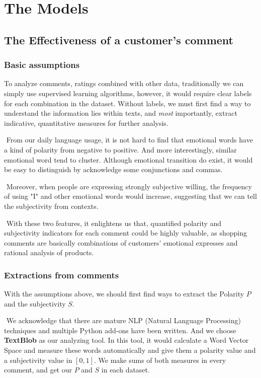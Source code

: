 \documentclass[12pt]{article}  %
\begin{document}
\section{The Models}

\subsection{The Effectiveness of a customer's comment}

\subsubsection{Basic assumptions}

To analyze comments, ratings combined with other data, traditionally we can simply use supervised learning algorithms, however, it would require clear labels for each combination in the dataset. Without labels, we must first find a way to understand the information lies within texts, and \emph{most} importantly, extract indicative, quantitative measures for further analysis.

​		From our daily language usage, it is not hard to find that emotional words have a kind of polarity from negative to positive. And more interestingly, similar emotional word tend to cluster. Although emotional transition do exist, it would be easy to distinguish by acknowledge some conjunctions and commas.

​		Moreover, when people are expressing strongly subjective willing, the frequency of using "I" and other emotional words would increase, suggesting that we can tell the subjectivity from contexts.

​		With these two features, it enlightens us that, quantified polarity and subjectivity indicators for each comment could be highly valuable, as shopping comments are basically combinations of customers' emotional expresses and rational analysis of products.

\subsubsection{Extractions from comments}

\label{sec:Extractions from comments}

With the assumptions above, we should first find ways to extract the Polarity $P$ and the subjectivity $S$.

​		We acknowledge that there are mature NLP (Natural Language Processing) techniques and multiple Python add-ons have been written. And we choose \textbf{TextBlob} as our analyzing tool. In this tool, it would calculate a Word Vector Space and measure these words automatically and give them a polarity value and a subjectivity value in $[0,1]$. We make sums of both measures in every comment, and get our $P$ and $S$ in each dataset.
\end{document}
